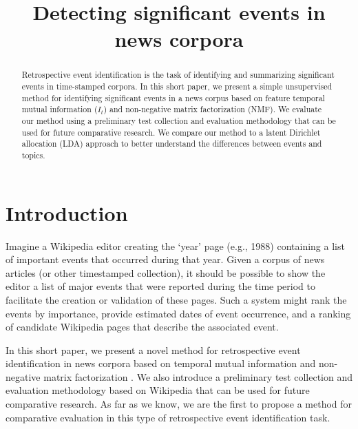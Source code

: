 \documentclass{sig-alternate}
\begin{document}
%

\title{Detecting significant events in news corpora}

\maketitle
\begin{abstract}
Retrospective event identification is the task of identifying and summarizing significant events in time-stamped corpora. In this short paper, we present a simple unsupervised method for identifying significant events in a news corpus based on feature temporal mutual information ($I_t$) and non-negative matrix factorization (NMF). We evaluate our method using a preliminary test collection and evaluation methodology that can be used for future comparative research. We compare our method to a latent Dirichlet allocation (LDA) approach to better understand the differences between events and topics.

\end{abstract}


\terms{}


\section{Introduction}

Imagine a Wikipedia editor creating the `year' page (e.g., 1988) containing a list of important events that occurred during that year. Given a corpus of news articles (or other timestamped collection), it should be possible to show the editor a list of major events that were reported during the time period to facilitate the creation or validation of these pages. Such a system might rank the events by importance, provide estimated dates of event occurrence, and a ranking of candidate Wikipedia pages that describe the associated event. 

In this short paper, we present a novel method for retrospective event identification in news corpora based on temporal mutual information \cite{Teng2008} and non-negative matrix factorization \cite{Lee2001}. We also introduce a preliminary test collection and evaluation methodology based on Wikipedia that can be used for future comparative research.  As far as we know, we are the first to propose a method for comparative evaluation in this type of retrospective event identification task.
\end{document}
